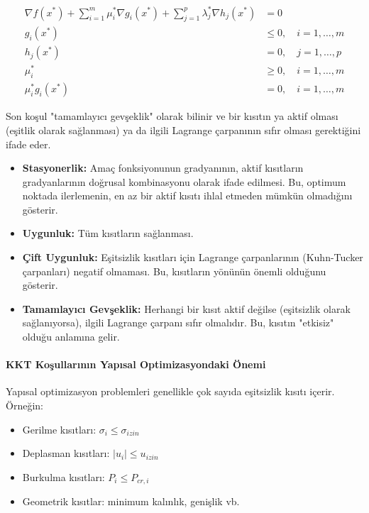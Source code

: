 \begin{equation}
\begin{aligned}
\nabla f(x^*) + \sum_{i=1}^m \mu_i^* \nabla g_i(x^*) + \sum_{j=1}^p \lambda_j^* \nabla h_j(x^*) &= 0 \\
g_i(x^*) &\leq 0, \quad i = 1, \ldots, m \\
h_j(x^*) &= 0, \quad j = 1, \ldots, p \\
\mu_i^* &\geq 0, \quad i = 1, \ldots, m \\
\mu_i^* g_i(x^*) &= 0, \quad i = 1, \ldots, m
\end{aligned}
\end{equation}

Son koşul "tamamlayıcı gevşeklik" olarak bilinir ve bir kısıtın ya aktif olması (eşitlik olarak sağlanması) ya da ilgili Lagrange çarpanının sıfır olması gerektiğini ifade eder.

\begin{tcolorbox}[title=KKT Koşullarının Yorumlanması]
\begin{itemize}
    \item \textbf{Stasyonerlik:} Amaç fonksiyonunun gradyanının, aktif kısıtların gradyanlarının doğrusal kombinasyonu olarak ifade edilmesi. Bu, optimum noktada ilerlemenin, en az bir aktif kısıtı ihlal etmeden mümkün olmadığını gösterir.
    
    \item \textbf{Uygunluk:} Tüm kısıtların sağlanması.
    
    \item \textbf{Çift Uygunluk:} Eşitsizlik kısıtları için Lagrange çarpanlarının (Kuhn-Tucker çarpanları) negatif olmaması. Bu, kısıtların yönünün önemli olduğunu gösterir.
    
    \item \textbf{Tamamlayıcı Gevşeklik:} Herhangi bir kısıt aktif değilse (eşitsizlik olarak sağlanıyorsa), ilgili Lagrange çarpanı sıfır olmalıdır. Bu, kısıtın "etkisiz" olduğu anlamına gelir.
\end{itemize}
\end{tcolorbox}

\paragraph{KKT Koşullarının Yapısal Optimizasyondaki Önemi}
Yapısal optimizasyon problemleri genellikle çok sayıda eşitsizlik kısıtı içerir. Örneğin:
\begin{itemize}
    \item Gerilme kısıtları: $\sigma_i \leq \sigma_{izin}$
    \item Deplasman kısıtları: $|u_i| \leq u_{izin}$
    \item Burkulma kısıtları: $P_i \leq P_{cr,i}$
    \item Geometrik kısıtlar: minimum kalınlık, genişlik vb.
\end{itemize}

